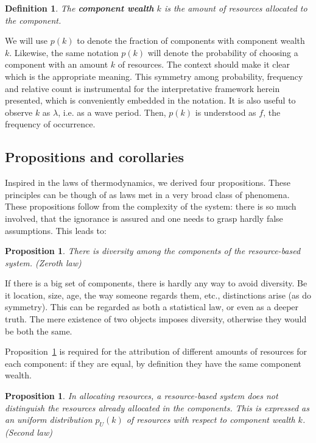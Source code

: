 \documentclass[a4paper, 11pt]{article} %
\newtheorem{proposition}[theorem]{Proposition}
\newtheorem{definition2}[theorem3]{Definition}
\begin{document}
\begin{definition2}
	The {\bf component wealth} $k$ is the amount of resources allocated to the component.
\end{definition2}

We will use $p(k)$ to denote the fraction of components with component wealth $k$. Likewise, the same notation $p(k)$ will denote the probability of choosing a component with an amount $k$ of resources.
The context should make it clear which is the appropriate meaning.
This symmetry among probability, frequency and relative count is
instrumental for the interpretative framework herein presented,
which is conveniently embedded in the notation.
It is also useful to observe 
$k$ as $\lambda$, i.e. as a wave period.
Then, $p(k)$ is understood as  $f$, the
frequency of occurrence.

\subsection{Propositions and corollaries}

Inspired in the laws of thermodynamics, we derived four
propositions.
These principles can be though of as laws met in
a very broad class of phenomena.
These propositions follow from the complexity of the system:
there is so much involved, that the ignorance is assured and
one needs to grasp hardly false assumptions. 
This leads to:


\begin{proposition}\label{prop:0}
	There is diversity among the components of the resource-based system. (Zeroth law)
\end{proposition}

If there is a big set of components, there is hardly any way to avoid diversity. Be it location, size, age, the way someone regards them, etc., distinctions arise (as do symmetry). This can be regarded as both a statistical law, or even as a deeper truth.
The mere existence of two objects imposes diversity,
otherwise they would be both the same.

Proposition~\ref{prop:0} is required for the attribution of different amounts of resources for each component:
if they are equal, by definition they have the same component wealth.

\begin{proposition}\label{prop:2}
	In allocating resources, a resource-based system does not distinguish the resources already allocated in the components. This is expressed as an uniform distribution $p_U(k)$ of resources with respect to component wealth $k$. (Second law)
\end{proposition}
\end{document}
